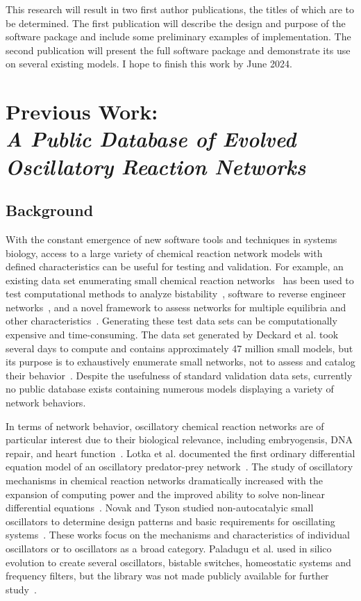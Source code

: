 \documentclass[12pt]{report}
\begin{document}
This research will result in two first author publications, the titles of which are to be determined. The first publication will describe the design and purpose of the software package and include some preliminary examples of implementation. The second publication will present the full software package and demonstrate its use on several existing models. I hope to finish this work by June 2024.


\chapter{Previous Work: \\ \textit{A Public Database of Evolved Oscillatory Reaction Networks}}
\section{Background}
With the constant emergence of new software tools and techniques in systems biology, access to a large variety of chemical reaction network models with defined characteristics can be useful for testing and validation. For example, an existing data set enumerating small chemical reaction networks~\cite{deckard2009} has been used to test computational methods to analyze bistability~\cite{pantea2010}, software to reverse engineer networks~\cite{nobile2013}, and a novel framework to assess networks for multiple equilibria and other characteristics~\cite{donnell2014}. Generating these test data sets can be computationally expensive and time-consuming. The data set generated by Deckard et al. took several days to compute and contains approximately 47 million small models, but its purpose is to exhaustively enumerate small networks, not to assess and catalog their behavior~\cite{deckard2009}.  Despite the usefulness of standard validation data sets, currently no public database exists containing numerous models displaying a variety of network behaviors.

In terms of network behavior, oscillatory chemical reaction networks are of particular interest due to their biological relevance, including embryogensis, DNA repair, and heart function~\cite{Novak2008,Aulehla2008,GevaZatorsky2006, Pol1928}. Lotka et al. documented the first ordinary differential equation model of an oscillatory predator-prey network~\cite{Lotka1910}. The study of oscillatory mechanisms in chemical reaction networks dramatically increased with the expansion of computing power and the improved ability to solve non-linear differential equations~\cite{Higgins1967}. Novak and Tyson studied non-autocatalyic small oscillators to determine design patterns and basic requirements for oscillating systems~\cite{Novak2008}. These works focus on the mechanisms and characteristics of individual oscillators or to oscillators as a broad category. Paladugu et al. used in silico evolution to create several oscillators, bistable switches, homeostatic systems and frequency filters, but the library was not made publicly available for further study~\cite{Paladugu2006}. 
\end{document}
